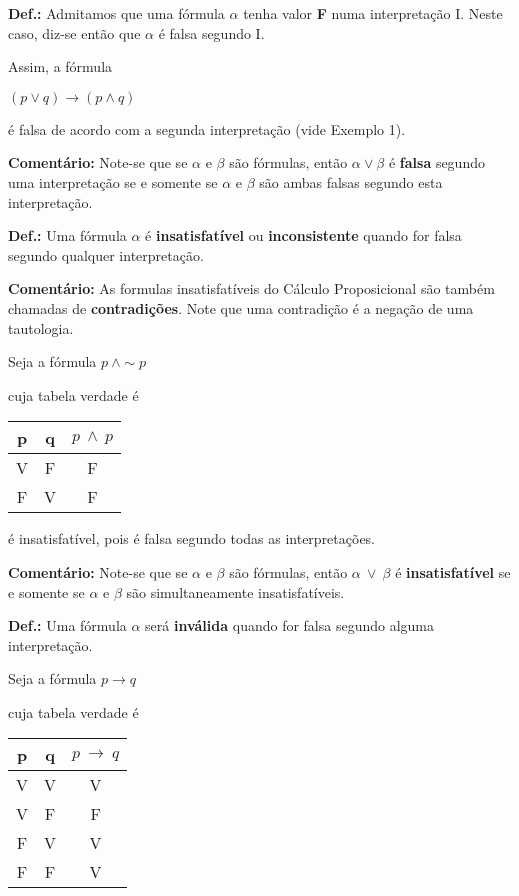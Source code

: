\bigskip
\noindent
\textbf{Def.:} Admitamos que uma fórmula $\alpha$ tenha valor \textbf{F} numa interpretação I.
Neste caso, diz-se então que $\alpha$ é falsa segundo I.

\noindent Assim, a fórmula

\centerline{$(p \lor q) \to (p \land q)$}

\noindent é falsa de acordo com a segunda interpretação (vide Exemplo 1).

\bigskip
\noindent
\textbf{Comentário:} Note-se que se $\alpha$ e $\beta$ são fórmulas, então $\alpha \lor \beta$ é \textbf{falsa} segundo uma interpretação se e somente se $\alpha$ e $\beta$ são ambas falsas segundo esta interpretação.


\bigskip
\noindent
\textbf{Def.:} Uma fórmula $\alpha$ é \textbf{insatisfatível} ou \textbf{inconsistente}  quando for falsa segundo qualquer interpretação.

\bigskip
\noindent
\textbf{Comentário:} As formulas insatisfatíveis do  Cálculo Proposicional são também chamadas de \textbf{contradições}.
Note que uma contradição é a negação de uma tautologia.

\begin{exemplo}
    Seja a fórmula $p\ \land \sim p$
\end{exemplo}
\noindent cuja tabela verdade é

\begin{center}
    \begin{tabular}{c c c}
        p & q & $p\ \land ~p$ \\ \hline
        V & F & F \\
        F & V & F
    \end{tabular}
\end{center}
é insatisfatível, pois é falsa segundo todas as interpretações.

\bigskip
\noindent
\textbf{Comentário:} Note-se que se $\alpha$ e $\beta$ são fórmulas, então $\alpha\ \lor\ \beta$ é \textbf{insatisfatível} se e somente se $\alpha$ e $\beta$ são simultaneamente insatisfatíveis.

\bigskip
\noindent
\textbf{Def.:} Uma fórmula $\alpha$ será \textbf{inválida} quando for falsa segundo alguma interpretação.

\begin{exemplo}
    Seja a fórmula $p \to q$
\end{exemplo}
\noindent cuja tabela verdade é

\begin{center}
    \begin{tabular}{c c c}
        p & q & $p\ \to ~q$ \\ \hline
        V & V & V \\
        V & F & F \\
        F & V & V \\
        F & F & V
    \end{tabular}
\end{center}


